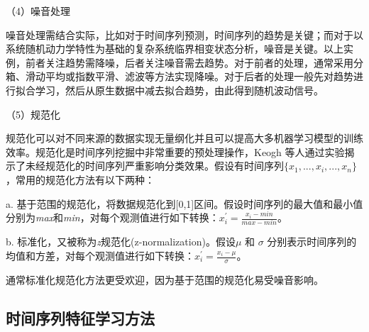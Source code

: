 （4）噪音处理

噪音处理需结合实际，比如对于时间序列预测，时间序列的趋势是关键；而对于以系统随机动力学特性为基础的复杂系统临界相变状态分析，噪音是关键。以上实例，前者关注趋势需降噪，后者关注噪音需去趋势。对于前者的处理，通常采用分箱、滑动平均或指数平滑、滤波等方法实现降噪。对于后者的处理一般先对趋势进行拟合学习，然后从原生数据中减去拟合趋势，由此得到随机波动信号。


（5）规范化

规范化可以对不同来源的数据实现无量纲化并且可以提高大多机器学习模型的训练效率。规范化是时间序列挖掘中非常重要的预处理操作，Keogh 等人通过实验揭示了未经规范化的时间序列严重影响分类效果\cite{keogh2003need}。假设有时间序列$\{x_{1}, ..., x_{i}, ..., x_{n}\}$，常用的规范化方法有以下两种：

a. 基于范围的规范化，将数据规范化到[0,1]区间。假设时间序列的最大值和最小值分别为\emph{max}和\emph{min}，对每个观测值进行如下转换：$x_{i}^{'} = \frac{x_{i}-min}{max - min} $。

b. 标准化，又被称为\emph{z}规范化(z-normalization)。假设$ \mu $ 和 $ \sigma $ 分别表示时间序列的均值和方差，对每个观测值进行如下转换：$x_{i}^{'} = \frac{x_{i} - \mu}{\sigma}$。

通常标准化规范化方法更受欢迎，因为基于范围的规范化易受噪音影响。

\subsection{时间序列特征学习方法} 


